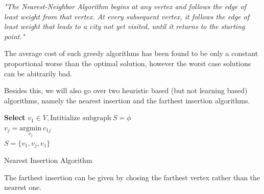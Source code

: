 \documentclass{article}
\theoremstyle{definition}
\begin{document}
\emph{"The Nearest-Neighbor Algorithm begins at any vertex and follows the
edge of least weight from that vertex. At every subsequent vertex, it
follows the edge of least weight that leads to a city not yet visited, until
it returns to the starting point."}

The average cost of such greedy algorithms has been found to be only a constant proportional worse than the optimal solution, however the worst case solutions can be abitrarily bad. 



Besides this, we will also go over two heuristic based  (but not learning based) algorithms, namely the nearest insertion and the farthest insertion algorithms. 

\begin{algorithm}[H]

\SetAlgoLined
\textbf{Select} $v_1\in V,\text{Intitialize subgraph}\ S= \phi$\\
 $v_j = \underset{v_j}{\text{argmin}}\ c_{1j}$  \\
$ S= \{v_1,v_j,v_1\}$ \\
 \EndFor
 \caption{Nearest Insertion Algorithm}

\end{algorithm}
The farthest insertion can be given by chosing the farthest vertex rather than the nearest one.
\end{document}
